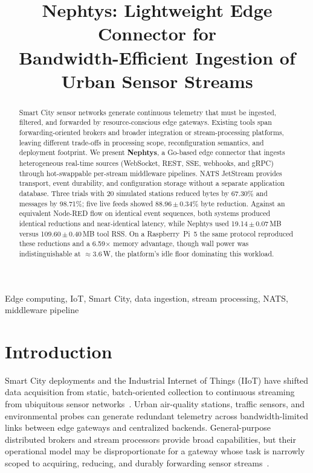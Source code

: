 \documentclass[conference]{IEEEtran}
\begin{document}
\title{Nephtys: Lightweight Edge Connector for\\Bandwidth-Efficient Ingestion of Urban Sensor Streams}

\author{
}

\maketitle

\begin{abstract}
Smart City sensor networks generate continuous telemetry that must be ingested, filtered, and forwarded by resource-conscious edge gateways. Existing tools span forwarding-oriented brokers and broader integration or stream-processing platforms, leaving different trade-offs in processing scope, reconfiguration semantics, and deployment footprint. We present \textbf{Nephtys}, a Go-based edge connector that ingests heterogeneous real-time sources (WebSocket, REST, SSE, webhooks, and gRPC) through hot-swappable per-stream middleware pipelines. NATS JetStream provides transport, event durability, and configuration storage without a separate application database. Three trials with 20 simulated stations reduced bytes by 67.30\% and messages by 98.71\%; five live feeds showed 88.96\,$\pm$\,0.34\% byte reduction. Against an equivalent Node-RED flow on identical event sequences, both systems produced identical reductions and near-identical latency, while Nephtys used 19.14\,$\pm$\,0.07\,MB versus 109.60\,$\pm$\,0.40\,MB tool RSS. On a Raspberry~Pi~5 the same protocol reproduced these reductions and a 6.59$\times$ memory advantage, though wall power was indistinguishable at ${\approx}3.6$\,W, the platform's idle floor dominating this workload.
\end{abstract}

\begin{IEEEkeywords}
Edge computing, IoT, Smart City, data ingestion, stream processing, NATS, middleware pipeline
\end{IEEEkeywords}

\section{Introduction}

Smart City deployments and the Industrial Internet of Things (IIoT) have shifted data acquisition from static, batch-oriented collection to continuous streaming from ubiquitous sensor networks~\cite{zanella2014iot}. Urban air-quality stations, traffic sensors, and environmental probes can generate redundant telemetry across bandwidth-limited links between edge gateways and centralized backends. General-purpose distributed brokers and stream processors provide broad capabilities, but their operational model may be disproportionate for a gateway whose task is narrowly scoped to acquiring, reducing, and durably forwarding sensor streams~\cite{shi2016edge,assuncao2018stream}.
\end{document}
